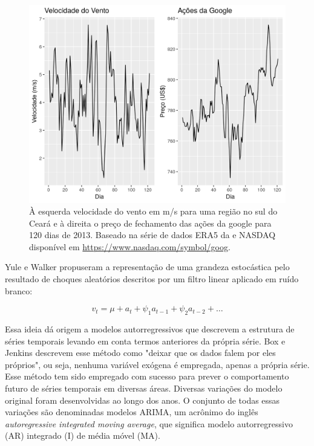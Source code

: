 \documentclass[
	12pt,				%
	openright,			%
	oneside,			%
	a4paper,			%
	english,			%
	french,				%
	spanish,			%
	brazil				%
	]{abntex2}
\begin{document}
\begin{figure}[h]
    \centering
	\includegraphics[width=\textwidth]{wind_money}
	\caption{À esquerda velocidade do vento em m/s para uma região no sul do Ceará e à direita o preço de fechamento das ações da google para 120 dias de 2013. Baseado na série de dados ERA5 da \cite{era5} e NASDAQ disponível em \url{https://www.nasdaq.com/symbol/goog}.}
\end{figure}
\FloatBarrier

Yule e Walker \cite{yulewalker} propuseram a representação de uma grandeza estocástica pelo resultado de choques aleatórios descritos por um filtro linear aplicado em ruído branco:

$$ v_{t} = \mu + a_t + \psi_{1}a_{t-1} + \psi_{2}a_{t-2} + \dots $$

Essa ideia dá origem a modelos autorregressivos que descrevem a estrutura de séries temporais levando em conta termos anteriores da própria série. Box e Jenkins \cite{boxjay} descrevem esse método como "deixar que os dados falem por eles próprios", ou seja, nenhuma variável exógena é empregada, apenas a própria série. Esse método tem sido empregado com sucesso para prever o comportamento futuro de séries temporais em diversas áreas. Diversas variações do modelo original foram desenvolvidas ao longo dos anos. O conjunto de todas essas variações são denominadas modelos ARIMA, um acrônimo do inglês \textit{autoregressive integrated moving average}, que significa modelo autorregressivo (AR) integrado (I) de média móvel (MA).

\end{document}
